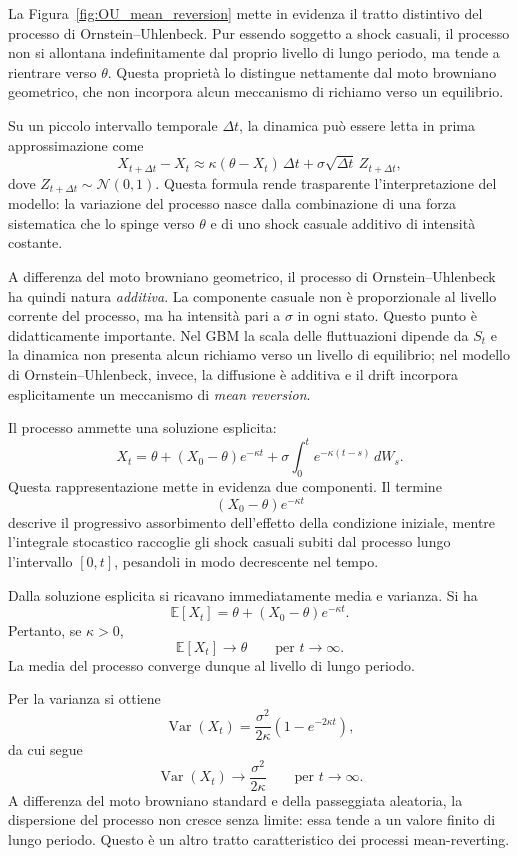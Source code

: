 La Figura~\ref{fig:OU_mean_reversion} mette in evidenza il tratto distintivo
del processo di Ornstein--Uhlenbeck. Pur essendo soggetto a shock casuali,
il processo non si allontana indefinitamente dal proprio livello di lungo
periodo, ma tende a rientrare verso $\theta$. Questa propriet\`a lo
distingue nettamente dal moto browniano geometrico, che non incorpora
alcun meccanismo di richiamo verso un equilibrio.

Su un piccolo intervallo temporale $\Delta t$, la dinamica pu\`o essere
letta in prima approssimazione come
\[
X_{t+\Delta t}-X_t
\approx
\kappa(\theta-X_t)\,\Delta t+\sigma\sqrt{\Delta t}\,Z_{t+\Delta t},
\]
dove $Z_{t+\Delta t}\sim \mathcal{N}(0,1)$. Questa formula rende
trasparente l'interpretazione del modello: la variazione del processo
nasce dalla combinazione di una forza sistematica che lo spinge verso
$\theta$ e di uno shock casuale additivo di intensit\`a costante.

A differenza del moto browniano geometrico, il processo di
Ornstein--Uhlenbeck ha quindi natura \emph{additiva}. La componente
casuale non \`e proporzionale al livello corrente del processo, ma ha
intensit\`a pari a $\sigma$ in ogni stato. Questo punto \`e
didatticamente importante. Nel GBM la scala delle fluttuazioni dipende da
$S_t$ e la dinamica non presenta alcun richiamo verso un livello di
equilibrio; nel modello di Ornstein--Uhlenbeck, invece, la diffusione \`e
additiva e il drift incorpora esplicitamente un meccanismo di
\emph{mean reversion}.

Il processo ammette una soluzione esplicita:
\[
X_t
=
\theta+(X_0-\theta)e^{-\kappa t}
+
\sigma \int_{0}^{t} e^{-\kappa(t-s)}\,dW_s.
\]
Questa rappresentazione mette in evidenza due componenti. Il termine
\[
(X_0-\theta)e^{-\kappa t}
\]
descrive il progressivo assorbimento dell'effetto della condizione
iniziale, mentre l'integrale stocastico raccoglie gli shock casuali
subiti dal processo lungo l'intervallo $[0,t]$, pesandoli in modo
decrescente nel tempo.

Dalla soluzione esplicita si ricavano immediatamente media e varianza.
Si ha
\[
\mathbb{E}[X_t]
=
\theta+(X_0-\theta)e^{-\kappa t}.
\]
Pertanto, se $\kappa>0$,
\[
\mathbb{E}[X_t]\longrightarrow \theta
\qquad
\text{per } t\to\infty.
\]
La media del processo converge dunque al livello di lungo periodo.

Per la varianza si ottiene
\[
\operatorname{Var}(X_t)
=
\frac{\sigma^2}{2\kappa}\left(1-e^{-2\kappa t}\right),
\]
da cui segue
\[
\operatorname{Var}(X_t)\longrightarrow \frac{\sigma^2}{2\kappa}
\qquad
\text{per } t\to\infty.
\]
A differenza del moto browniano standard e della passeggiata aleatoria,
la dispersione del processo non cresce senza limite: essa tende a un
valore finito di lungo periodo. Questo \`e un altro tratto caratteristico
dei processi mean-reverting.

